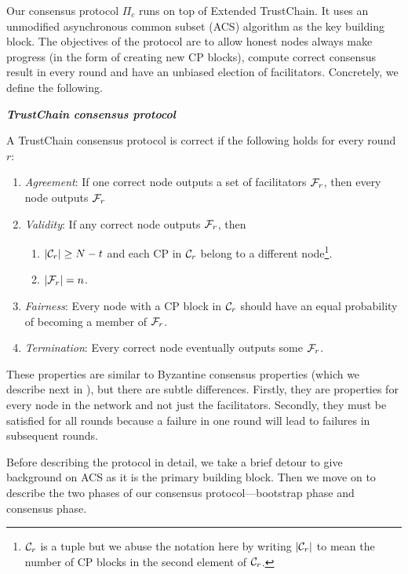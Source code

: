 Our consensus protocol $\Pi_c$ runs on top of Extended TrustChain.
It uses an unmodified asynchronous common subset (ACS) algorithm as the key building block.
The objectives of the protocol are to
    allow honest nodes always make progress (in the form of creating new CP blocks),
    compute correct consensus result in every round
    and have an unbiased election of facilitators.
Concretely, we define the following.
\begin{definition}
\label{def:consensus}
\textbf{\emph{TrustChain consensus protocol}}

A TrustChain consensus protocol is correct if the following holds for every round $r$:
\begin{enumerate}
    \item \emph{Agreement}:
        If one correct node outputs a set of facilitators $\mathcal{F}_r$,
        then every node outputs $\mathcal{F}_r$
    \item \emph{Validity}:
        If any correct node outputs $\mathcal{F}_r$, then 
            \begin{enumerate}
                \item $|\mathcal{C}_r| \ge N - t$ and each CP in $\mathcal{C}_r$ belong to a different node\footnote{
                $\mathcal{C}_r$ is a tuple but we abuse the notation here by writing $|\mathcal{C}_r|$ to mean the number of CP blocks in the second element of $\mathcal{C}_r$.}.
                \item $|\mathcal{F}_r| = n$.
            \end{enumerate}
    \item \emph{Fairness}:
        Every node with a CP block in $\mathcal{C}_r$ should have an equal probability of becoming a member of $\mathcal{F}_r$.
    \item \emph{Termination}:
        Every correct node eventually outputs some $\mathcal{F}_r$.
\end{enumerate}
\end{definition}
These properties are similar to Byzantine consensus properties (which we describe next in ), but there are subtle differences.
Firstly, they are properties for every node in the network and not just the facilitators.
Secondly, they must be satisfied for all rounds because a failure in one round will lead to failures in subsequent rounds.

Before describing the protocol in detail,
we take a brief detour to give background on ACS as it is the primary building block.
Then we move on to describe the two phases of our consensus protocol---bootstrap phase and consensus phase.

